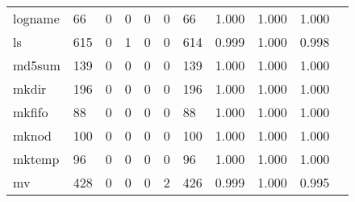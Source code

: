 \begin{longtable}{lp{1.10cm}p{1.10cm}p{1.10cm}p{1.10cm}p{1.10cm}p{1.10cm}p{1.10cm}p{1.10cm}p{1.10cm}p{1.10cm}}
logname   &                     66 &                                  0 &                                 0 &                                0 &                                 0 &                              66 &                          1.000 &                                 1.000 &                               1.000 \\
ls        &                    615 &                                  0 &                                 1 &                                0 &                                 0 &                             614 &                          0.999 &                                 1.000 &                               0.998 \\
md5sum    &                    139 &                                  0 &                                 0 &                                0 &                                 0 &                             139 &                          1.000 &                                 1.000 &                               1.000 \\
mkdir     &                    196 &                                  0 &                                 0 &                                0 &                                 0 &                             196 &                          1.000 &                                 1.000 &                               1.000 \\
mkfifo    &                     88 &                                  0 &                                 0 &                                0 &                                 0 &                              88 &                          1.000 &                                 1.000 &                               1.000 \\
mknod     &                    100 &                                  0 &                                 0 &                                0 &                                 0 &                             100 &                          1.000 &                                 1.000 &                               1.000 \\
mktemp    &                     96 &                                  0 &                                 0 &                                0 &                                 0 &                              96 &                          1.000 &                                 1.000 &                               1.000 \\
mv        &                    428 &                                  0 &                                 0 &                                0 &                                 2 &                             426 &                          0.999 &                                 1.000 &                               0.995 \\

\end{longtable}
